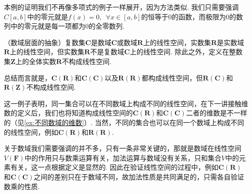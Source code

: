 本例的证明我们不再像多项式的例子一样展开，因为方法类似. 我们只需要强调$C[a,b]$中的零元就是$f(x)=0,\enspace\forall x\in[a,b]$的恒等于$0$的函数，而极限为0的数列中的零元就是每一项都为$0$的全零数列.

\begin{example}{}{}
    （数域层面的抽象）复数集$\mathbf{C}$是数域$\mathbf{C}$或数域$\mathbf{R}$上的线性空间，实数集$\mathbf{R}$是实数域$\mathbf{R}$上的线性空间，但实数集$\mathbf{R}$不是复数域$\mathbf{C}$上的线性空间. 除此之外，定义在整数集$\mathbf{Z}$上的全体实数$\mathbf{R}$不构成线性空间.

    总结而言就是，$\mathbf{C}(\mathbf{R})$和$\mathbf{C}(\mathbf{C})$以及$\mathbf{R(R)}$都构成线性空间，但$\mathbf{R}(\mathbf{C})$和$\mathbf{R}(\mathbf{Z})$不构成线性空间.
\end{example}

这一例子表明，同一集合可以在不同数域上构成不同的线性空间，在下一讲接触维数的定义后，我们也将知道构成线性空间的$\mathbf{C}(\mathbf{R})$和$\mathbf{C}(\mathbf{C})$二者的维数是不一样的（见\autoref{ex:不同数域的维数}）. 当然，不同的集合也可以在同一个数域上构成不同的线性空间，例如$\mathbf{C(R)}$和$\mathbf{R(R)}$.

关于数域我们需要强调的并不多，只有一条非常关键的，那就是数域在线性空间$V(\mathbf{F})$中的作用只与数乘运算有关，加法运算与数域没有关系，只和集合$V$中的元素有关，这一点根据定义是显然的. 因此在验证线性空间的过程中，例如$\mathbf{C}(\mathbf{R})$和$\mathbf{C}(\mathbf{C})$之间的差别只在于数域不同，故加法性质是共同满足的，只需各自验证数乘的性质.

